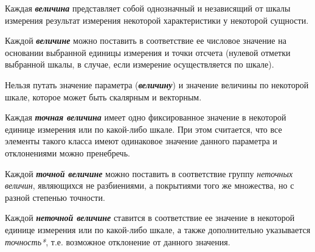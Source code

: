 Каждая \textbf{\textit{величина}} представляет собой однозначный и независящий от шкалы измерения результат измерения некоторой характеристики у некоторой сущности.
		
Каждой \textbf{\textit{величине}} можно поставить в соответствие ее числовое значение на основании выбранной единицы измерения и точки отсчета (нулевой отметки выбранной шкалы, в случае, если измерение осуществляется по шкале).
		
Нельзя путать значение параметра (\textbf{\textit{величину}}) и значение величины по некоторой шкале, которое может быть скалярным и векторным.
	
\begin{SCn}
\end{SCn}

Каждая \textbf{\textit{точная величина}} имеет одно фиксированное значение в некоторой единице измерения или по какой-либо шкале. При этом считается, что все элементы такого класса имеют одинаковое значение данного параметра и отклонениями можно пренебречь.
		
Каждой \textbf{\textit{точной величине}} можно поставить в соответствие группу \textit{неточных величин}, являющихся не разбиениями, а покрытиями того же множества, но с разной степенью точности.

\begin{SCn}
\end{SCn}

Каждой \textbf{\textit{неточной величине}} ставится в соответствие ее значение в некоторой единице измерения или по какой-либо шкале, а также дополнительно указывается \textit{точность*}, т.е. возможное отклонение от данного значения.

\begin{SCn}
\end{SCn}

